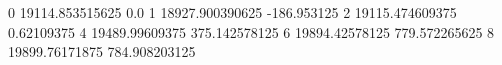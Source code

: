 0 19114.853515625 0.0
1 18927.900390625 -186.953125
2 19115.474609375 0.62109375
4 19489.99609375 375.142578125
6 19894.42578125 779.572265625
8 19899.76171875 784.908203125
